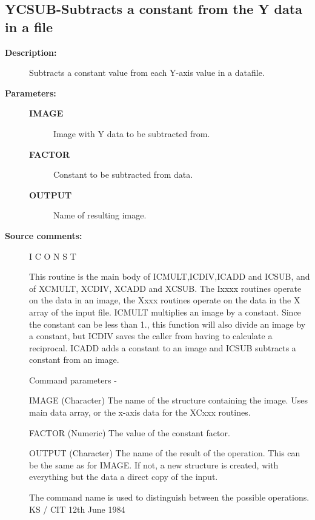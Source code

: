 \subsection{YCSUB-\label{YCSUB}Subtracts a constant from the Y data in a file}
\begin{description}

\item [\textbf{Description:}]
 Subtracts a constant value from each Y-axis value in a datafile.

\item [\textbf{Parameters:}]
\begin{description}
\item [\textbf{IMAGE}]
 Image with Y data to be subtracted from.
\item [\textbf{FACTOR}]
 Constant to be subtracted from data.
\item [\textbf{OUTPUT}]
 Name of resulting image.
\end{description}

\item [\textbf{Source comments:}]
\begin{terminalv}
 I C O N S T

 This routine is the main body of ICMULT,ICDIV,ICADD and ICSUB,
 and of XCMULT, XCDIV, XCADD and XCSUB.  The Ixxxx routines
 operate on the data in an image, the Xxxx routines operate on
 the data in the X array of the input file.
 ICMULT multiplies an image by a constant.  Since the constant
 can be less than 1., this function will also divide an
 image by a constant, but ICDIV saves the caller from having
 to calculate a reciprocal. ICADD adds a constant to an image and
 ICSUB subtracts a constant from an image.

 Command parameters -

 IMAGE  (Character) The name of the structure containing the image.
        Uses main data array, or the x-axis data for the XCxxx routines.

 FACTOR (Numeric) The value of the constant factor.

 OUTPUT (Character) The name of the result of the operation.  This
        can be the same as for IMAGE.  If not, a new structure
        is created, with everything but the data a direct
        copy of the input.

 The command name is used to distinguish between the
 possible operations.
                                  KS / CIT 12th June 1984
\end{terminalv}
\end{description}
